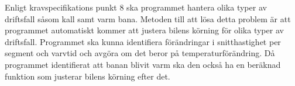 Enligt kravspecifikations punkt 8 ska programmet hantera olika typer av driftsfall såsom kall samt varm bana.
Metoden till att lösa detta problem är att programmet automatiskt kommer att justera bilens körning för olika typer av driftsfall. Programmet ska kunna identifiera förändringar i snitthastighet per segment och varvtid och avgöra om det beror på temperaturförändring. Då programmet identifierat att banan blivit varm ska den också ha en beräknad funktion som justerar bilens körning efter det.